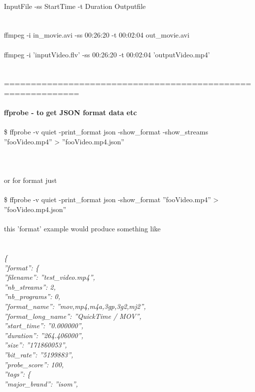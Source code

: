 \documentclass[10pt,a4paper]{article}
\begin{document}
{{{{{{{{{{{{{{\\
InputFile -ss StartTime -t Duration Outputfile\\
\\
\\
ffmpeg -i in\_movie.avi -ss 00:26:20 -t 00:02:04 out\_movie.avi\\
\\
ffmpeg -i 'inputVideo.flv' -ss 00:26:20 -t 00:02:04 'outputVideo.mp4'\\
\\
\\
============================================================\\
\\
\textbf{ffprobe - to get JSON format data etc}}{\Large \\
\\
\$ ffprobe -v quiet -print\_format json -show\_format -show\_streams ''fooVideo.mp4'' > ''fooVideo.mp4.json''\\
\\
\\
\\
or for format just\\
\\
\$ ffprobe -v quiet -print\_format json -show\_format ''fooVideo.mp4'' > ''fooVideo.mp4.json''\\
\\
this 'format' example would produce something like\\
\\
\\
}\textit{\{\\
    ''format'': \{\\
        ''filename'': ''test\_video.mp4'',\\
        ''nb\_streams'': 2,\\
        ''nb\_programs'': 0,\\
        ''format\_name'': ''mov,mp4,m4a,3gp,3g2,mj2'',\\
        ''format\_long\_name'': ''QuickTime / MOV'',\\
        ''start\_time'': ''0.000000'',\\
        ''duration'': ''264.406000'',\\
        ''size'': ''171860053'',\\
        ''bit\_rate'': ''5199883'',\\
        ''probe\_score'': 100,\\
        ''tags'': \{\\
            ''major\_brand'': ''isom'',\\
}}}}}}}}}}}}}}
\end{document}
